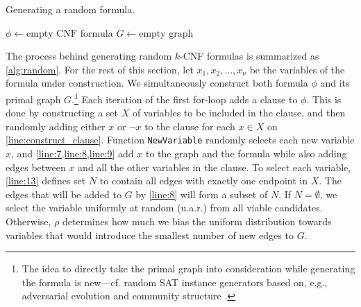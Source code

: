 \begin{algorithm}[t]
  \caption{Generating a random formula.}\label{alg:random}
  $\phi \gets \text{empty CNF formula}$\;
  $G \gets \text{empty graph}$\;
  \Return{$\phi$}\;
\end{algorithm}

The process behind generating random $k$-CNF formulas is summarized as
\cref{alg:random}. For the rest of this section, let $x_1, x_2, \dots, x_\nu$ be
the variables of the formula under construction. We simultaneously construct
both formula $\phi$ and its primal graph $G$.\footnote{The idea to directly take
  the primal graph into consideration while generating the formula is new---cf.
  random SAT instance generators based on, e.g., adversarial evolution
  \citep{DBLP:conf/cec/HossainALA10} and community structure
  \citep{DBLP:journals/ai/Giraldez-CruL16}.} Each iteration of the first
for-loop adds a clause to $\phi$. This is done by constructing a set $X$ of
variables to be included in the clause, and then randomly adding either $x$ or
$\neg x$ to the clause for each $x \in X$ on \cref{line:construct_clause}.
Function \texttt{NewVariable} randomly selects each new variable $x$, and
\cref{line:7,line:8,line:9} add $x$ to the graph and the formula while also
adding edges between $x$ and all the other variables in the clause. To select
each variable, \cref{line:13} defines set $N$ to contain all edges with exactly
one endpoint in $X$. The edges that will be added to $G$ by \cref{line:8} will
form a subset of $N$. If $N = \emptyset$, we select the variable uniformly at
random (u.a.r.) from all viable candidates. Otherwise, $\rho$ determines how
much we bias the uniform distribution towards variables that would introduce the
smallest number of new edges to $G$.

